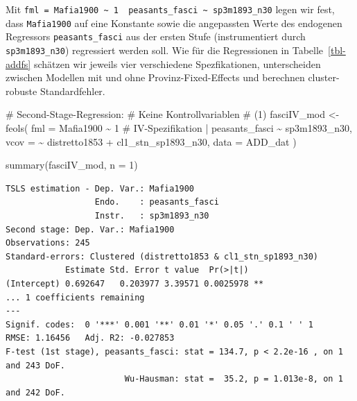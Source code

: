 \documentclass[
  a4paper,
  DIV=11,
  oneside]{scrreprt}
\newenvironment{Shaded}{\begin{snugshade}}{\end{snugshade}}
\newcommand{\AttributeTok}[1]{\textcolor[rgb]{0.40,0.45,0.13}{#1}}
\newcommand{\CommentTok}[1]{\textcolor[rgb]{0.37,0.37,0.37}{#1}}
\newcommand{\DecValTok}[1]{\textcolor[rgb]{0.68,0.00,0.00}{#1}}
\newcommand{\FunctionTok}[1]{\textcolor[rgb]{0.28,0.35,0.67}{#1}}
\newcommand{\NormalTok}[1]{\textcolor[rgb]{0.00,0.23,0.31}{#1}}
\newcommand{\OtherTok}[1]{\textcolor[rgb]{0.00,0.23,0.31}{#1}}
\newcommand{\SpecialCharTok}[1]{\textcolor[rgb]{0.37,0.37,0.37}{#1}}
\begin{document}
Mit
\texttt{fml\ =\ Mafia1900\ \textasciitilde{}\ 1\ \textbar{}\ peasants\_fasci\ \textasciitilde{}\ sp3m1893\_n30}
legen wir fest, dass \texttt{Mafia1900} auf eine Konstante sowie die
angepassten Werte des endogenen Regressors \texttt{peasants\_fasci} aus
der ersten Stufe (instrumentiert durch \texttt{sp3m1893\_n30})
regressiert werden soll. Wie für die Regressionen in
Tabelle~\ref{tbl-addfs} schätzen wir jeweils vier verschiedene
Spezfikationen, unterscheiden zwischen Modellen mit und ohne
Provinz-Fixed-Effects und berechnen cluster-robuste Standardfehler.

\begin{Shaded}
\begin{Highlighting}[]
\CommentTok{\# Second{-}Stage{-}Regression:}
\CommentTok{\# Keine Kontrollvariablen}
\CommentTok{\# (1)}
\NormalTok{fasciIV\_mod }\OtherTok{\textless{}{-}} \FunctionTok{feols}\NormalTok{(}
  \AttributeTok{fml =}\NormalTok{ Mafia1900 }\SpecialCharTok{\textasciitilde{}} \DecValTok{1} 
  \CommentTok{\# IV{-}Spezifikation}
  \SpecialCharTok{|}\NormalTok{ peasants\_fasci }\SpecialCharTok{\textasciitilde{}}\NormalTok{ sp3m1893\_n30,}
  \AttributeTok{vcov =} \SpecialCharTok{\textasciitilde{}}\NormalTok{ distretto1853 }\SpecialCharTok{+}\NormalTok{ cl1\_stn\_sp1893\_n30,}
  \AttributeTok{data =}\NormalTok{ ADD\_dat}
\NormalTok{)}

\FunctionTok{summary}\NormalTok{(fasciIV\_mod, }\AttributeTok{n =} \DecValTok{1}\NormalTok{)}
\end{Highlighting}
\end{Shaded}

\begin{verbatim}
TSLS estimation - Dep. Var.: Mafia1900
                  Endo.    : peasants_fasci
                  Instr.   : sp3m1893_n30
Second stage: Dep. Var.: Mafia1900
Observations: 245
Standard-errors: Clustered (distretto1853 & cl1_stn_sp1893_n30) 
            Estimate Std. Error t value  Pr(>|t|)    
(Intercept) 0.692647   0.203977 3.39571 0.0025978 ** 
... 1 coefficients remaining
---
Signif. codes:  0 '***' 0.001 '**' 0.01 '*' 0.05 '.' 0.1 ' ' 1
RMSE: 1.16456   Adj. R2: -0.027853
F-test (1st stage), peasants_fasci: stat = 134.7, p < 2.2e-16 , on 1 and 243 DoF.
                        Wu-Hausman: stat =  35.2, p = 1.013e-8, on 1 and 242 DoF.
\end{verbatim}
\end{document}
